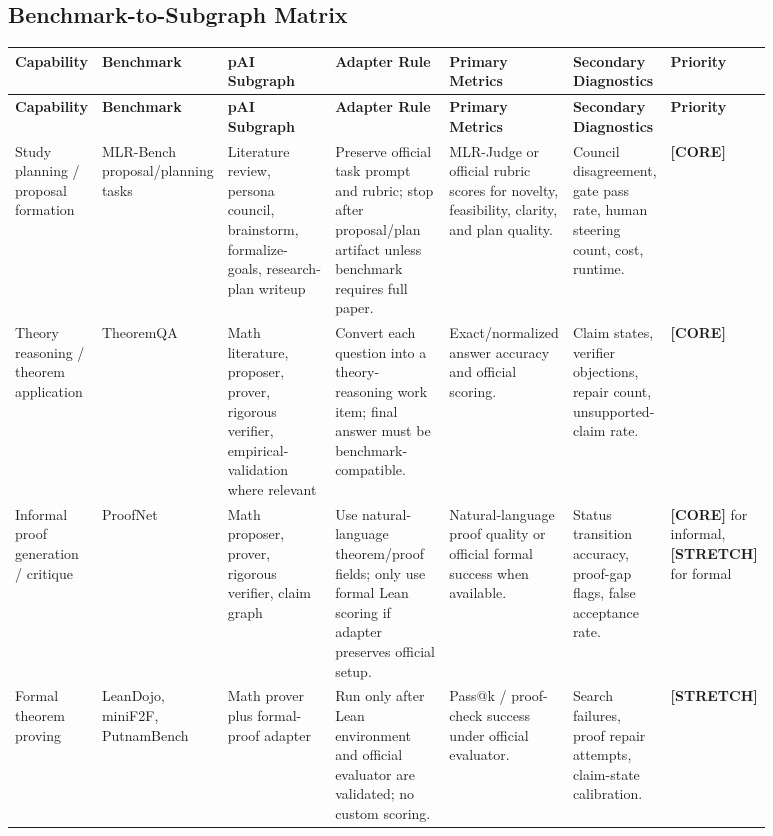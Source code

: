 \documentclass[11pt]{article}
\newcommand{\core}{\textbf{\textcolor{green!45!black}{[CORE]}}}
\newcommand{\tagstretch}{\textbf{\textcolor{blue!65!black}{[STRETCH]}}}
\newcommand{\pai}{pAI}
\begin{document}
\begin{landscape}
\section*{Benchmark-to-Subgraph Matrix}
\small
\setlength{\tabcolsep}{3pt}
\begin{longtable}{>{\raggedright\arraybackslash}p{0.11\linewidth} >{\raggedright\arraybackslash}p{0.11\linewidth} >{\raggedright\arraybackslash}p{0.16\linewidth} >{\raggedright\arraybackslash}p{0.16\linewidth} >{\raggedright\arraybackslash}p{0.14\linewidth} >{\raggedright\arraybackslash}p{0.10\linewidth} >{\raggedright\arraybackslash}p{0.10\linewidth}}
\toprule
\textbf{Capability} & \textbf{Benchmark} & \textbf{\pai{} Subgraph} & \textbf{Adapter Rule} & \textbf{Primary Metrics} & \textbf{Secondary Diagnostics} & \textbf{Priority} \\
\midrule
\endfirsthead
\toprule
\textbf{Capability} & \textbf{Benchmark} & \textbf{\pai{} Subgraph} & \textbf{Adapter Rule} & \textbf{Primary Metrics} & \textbf{Secondary Diagnostics} & \textbf{Priority} \\
\midrule
\endhead
Study planning / proposal formation & MLR-Bench proposal/planning tasks & Literature review, persona council, brainstorm, formalize-goals, research-plan writeup & Preserve official task prompt and rubric; stop after proposal/plan artifact unless benchmark requires full paper. & MLR-Judge or official rubric scores for novelty, feasibility, clarity, and plan quality. & Council disagreement, gate pass rate, human steering count, cost, runtime. & \core{} \\
Theory reasoning / theorem application & TheoremQA & Math literature, proposer, prover, rigorous verifier, empirical-validation where relevant & Convert each question into a theory-reasoning work item; final answer must be benchmark-compatible. & Exact/normalized answer accuracy and official scoring. & Claim states, verifier objections, repair count, unsupported-claim rate. & \core{} \\
Informal proof generation / critique & ProofNet & Math proposer, prover, rigorous verifier, claim graph & Use natural-language theorem/proof fields; only use formal Lean scoring if adapter preserves official setup. & Natural-language proof quality or official formal success when available. & Status transition accuracy, proof-gap flags, false acceptance rate. & \core{} for informal, \tagstretch{} for formal \\
Formal theorem proving & LeanDojo, miniF2F, PutnamBench & Math prover plus formal-proof adapter & Run only after Lean environment and official evaluator are validated; no custom scoring. & Pass@k / proof-check success under official evaluator. & Search failures, proof repair attempts, claim-state calibration. & \tagstretch{} \\

\end{longtable}
\end{landscape}
\end{document}
